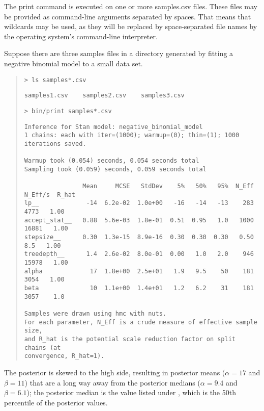 The print command is executed on one or more samples.csv files.  These
files may be provided as command-line arguments separated by spaces.
That means that wildcards may be used, as they will be replaced by
space-separated file names by the operating system's command-line
interpreter. 

Suppose there are three samples files in a directory generated by
fitting a negative binomial model to a small data set.
%
\begin{quote}
\begin{Verbatim}[fontsize=\small]
> ls samples*.csv
\end{Verbatim}
%
\begin{Verbatim}[fontshape=sl,fontsize=\small]
samples1.csv	samples2.csv	samples3.csv
\end{Verbatim}
%
\begin{Verbatim}[fontsize=\small]
> bin/print samples*.csv
\end{Verbatim}
%
{
\begin{Verbatim}[fontshape=sl,fontsize=\footnotesize]
Inference for Stan model: negative_binomial_model
1 chains: each with iter=(1000); warmup=(0); thin=(1); 1000 iterations saved.

Warmup took (0.054) seconds, 0.054 seconds total
Sampling took (0.059) seconds, 0.059 seconds total

                Mean     MCSE   StdDev    5%   50%   95%  N_Eff  N_Eff/s  R_hat
lp__             -14  6.2e-02  1.0e+00   -16   -14   -13    283     4773   1.00
accept_stat__   0.88  5.6e-03  1.8e-01  0.51  0.95   1.0   1000    16881   1.00
stepsize__      0.30  1.3e-15  8.9e-16  0.30  0.30  0.30   0.50      8.5   1.00
treedepth__      1.4  2.6e-02  8.0e-01  0.00   1.0   2.0    946    15978   1.00
alpha             17  1.8e+00  2.5e+01   1.9   9.5    50    181     3054   1.00
beta              10  1.1e+00  1.4e+01   1.2   6.2    31    181     3057    1.0

Samples were drawn using hmc with nuts.
For each parameter, N_Eff is a crude measure of effective sample size,
and R_hat is the potential scale reduction factor on split chains (at 
convergence, R_hat=1).
\end{Verbatim}
}
\end{quote}
%
The posterior is skewed to the high side, resulting in posterior means
($\alpha=17$ and $\beta=11$) that are a long way away from the posterior
medians ($\alpha=9.4$ and $\beta=6.1$);  the posterior median is the
value listed under , which is the 50th percentile of the
posterior values.

